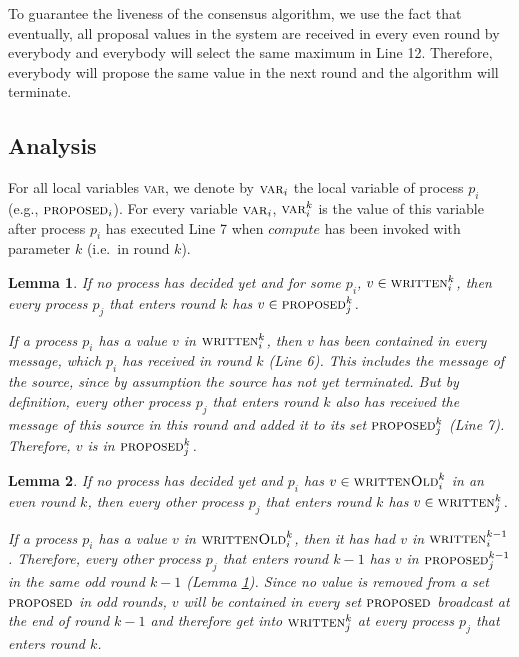 \documentclass[conference, compsoc]{IEEEtran}
\newtheorem{lemma}{Lemma}
\def\proposed{\textsc{proposed}}
\def\written{\textsc{written}}
\def\wlr{\textsc{writtenOld}}
\def\compute{\textit{compute}}
\begin{document}
To guarantee the liveness of the consensus algorithm, we use the fact that eventually, all proposal values in the system are received in every even round by everybody and everybody will select the same maximum in Line 12. Therefore, everybody will propose the same value in the next round and the algorithm will terminate.

\subsection{Analysis}

For all local variables \textsc{var}, we denote by $\textsc{var}_i$ the local variable of process $p_i$ (e.g., $\proposed_i$). For every variable $\textsc{var}_i$, $\textsc{var}_i^k$ is the value of this variable after process $p_i$ has executed Line 7 when $\compute$ has been invoked with parameter $k$ (i.e.~in round $k$). 

\begin{lemma}
 \label{lem:nootherwrites}
 If no process has decided yet and for some $p_i$, $v \in \written_i^k$, then every process $p_j$ that enters round $k$ has $v \in \proposed_j^k$.
 \begin{IEEEproof}  
  If a process $p_i$ has a value $v$ in $\written_i^k$, then $v$ has been contained in every message, which $p_i$ has received in round $k$ (Line 6). This includes the message of the source, since by assumption the source has not yet terminated. But by definition, every other process $p_j$ that enters round $k$ also has received the message of this source in this round and added it to its set $\proposed_j^k$ (Line 7). Therefore, $v$ is in $\proposed_j^k$.  
 \end{IEEEproof}
\end{lemma}

\begin{lemma}
 \label{lem:writeeverywhere}
 If no process has decided yet and $p_i$ has $v \in \wlr_i^k$ in an even round $k$, then every other process $p_j$ that enters round $k$ has $v \in \written_j^k$.
 \begin{IEEEproof}
 If a process $p_i$ has a value $v$ in $\wlr_i^k$, then it has had $v$ in $\written_i^{k-1}$. Therefore, every other process $p_j$ that enters round $k-1$ has $v$ in $\proposed_j^{k-1}$ in the same odd round $k-1$ (Lemma \ref{lem:nootherwrites}). Since no value is removed from a set $\proposed$ in odd rounds, $v$ will be contained in every set $\proposed$ broadcast at the end of round $k-1$ and therefore get into $\written_j^{k}$ at every process $p_j$ that enters round $k$.   
 \end{IEEEproof}
\end{lemma}
\end{document}
